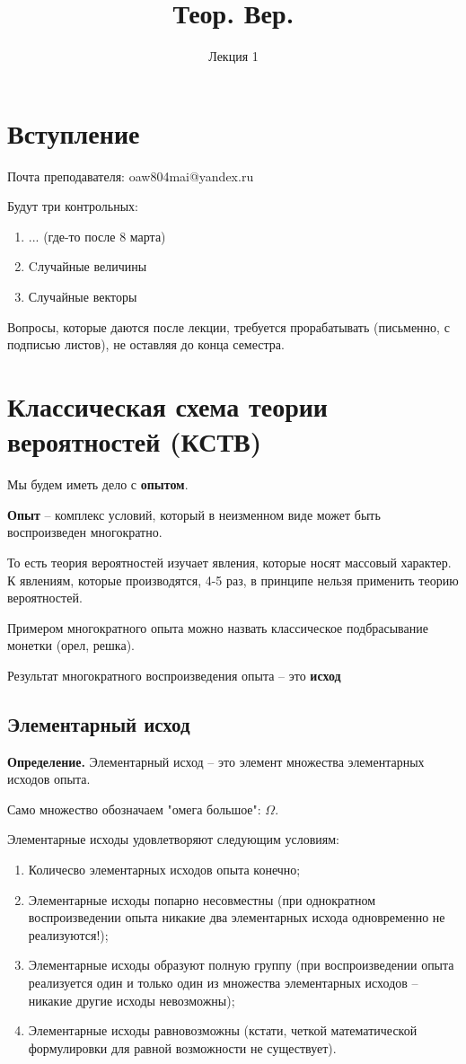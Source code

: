 \documentclass{article}
\title{Теор. Вер.}
\author{Лекция 1}
\begin{document}
\maketitle

\section{Вступление}

Почта преподавателя: oaw804mai@yandex.ru

Будут три контрольных:

\begin{enumerate}
\item ... (где-то после 8 марта)
\item Cлучайные величины
\item Случайные векторы
\end{enumerate}

Вопросы, которые даются после лекции, требуется прорабатывать (письменно, с подписью листов), не оставляя до конца семестра.

\section{Классическая схема теории вероятностей (КСТВ)}

Мы будем иметь дело с \textbf{опытом}.

\textbf{Опыт} -- комплекс условий, который в неизменном виде может быть воспроизведен многократно.

То есть теория вероятностей изучает явления, которые носят массовый характер. К явлениям, которые производятся, 4-5 раз, в принципе нельзя применить теорию вероятностей.

Примером многократного опыта можно назвать классическое подбрасывание монетки (орел, решка). 

Результат многократного воспроизведения опыта -- это \textbf{исход}

\subsection{Элементарный исход}
\textbf{Определение.} Элементарный исход -- это элемент множества элементарных исходов опыта.

Само множество обозначаем "омега большое": $\Omega$.

Элементарные исходы удовлетворяют следующим условиям:

\begin{enumerate}
\item Количесво элементарных исходов опыта конечно;
\item Элементарные исходы попарно несовместны (при однократном воспроизведении опыта никакие два элементарных исхода одновременно не реализуются!);
\item Элементарные исходы образуют полную группу (при воспроизведении опыта реализуется один и только один из множества элементарных исходов -- никакие другие исходы невозможны);
\item Элементарные исходы равновозможны (кстати, четкой математической формулировки для равной возможности не существует).
\end{enumerate}
\end{document}

